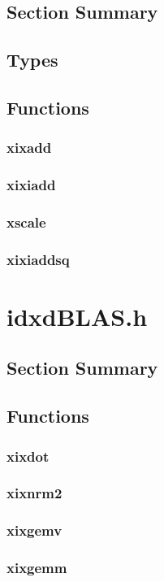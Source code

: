 \documentclass[12pt]{article}
\theoremstyle{plain}
\numberwithin{equation}{section}
\begin{document}
  \subsection{Section Summary}
  \subsection{Types}
  \subsection{Functions}
    \subsubsection{xixadd}
    \subsubsection{xixiadd}
    \subsubsection{xscale}
    \subsubsection{xixiaddsq}
\section{idxdBLAS.h}
  \subsection{Section Summary}
  \subsection{Functions}
    \subsubsection{xixdot}
    \subsubsection{xixnrm2}
    \subsubsection{xixgemv}
    \subsubsection{xixgemm}
\end{document}
